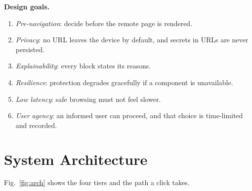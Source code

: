\documentclass[conference]{IEEEtran}
\begin{document}
\textbf{Design goals.}
\begin{enumerate}
  \item[G1] \emph{Pre-navigation}: decide before the remote page is rendered.
  \item[G2] \emph{Privacy}: no URL leaves the device by default, and secrets in
        URLs are never persisted.
  \item[G3] \emph{Explainability}: every block states its reasons.
  \item[G4] \emph{Resilience}: protection degrades gracefully if a component
        is unavailable.
  \item[G5] \emph{Low latency}: safe browsing must not feel slower.
  \item[G6] \emph{User agency}: an informed user can proceed, and that choice
        is time-limited and recorded.
\end{enumerate}

\section{System Architecture}
\label{sec:arch}

Fig.~\ref{fig:arch} shows the four tiers and the path a click takes.
\end{document}
